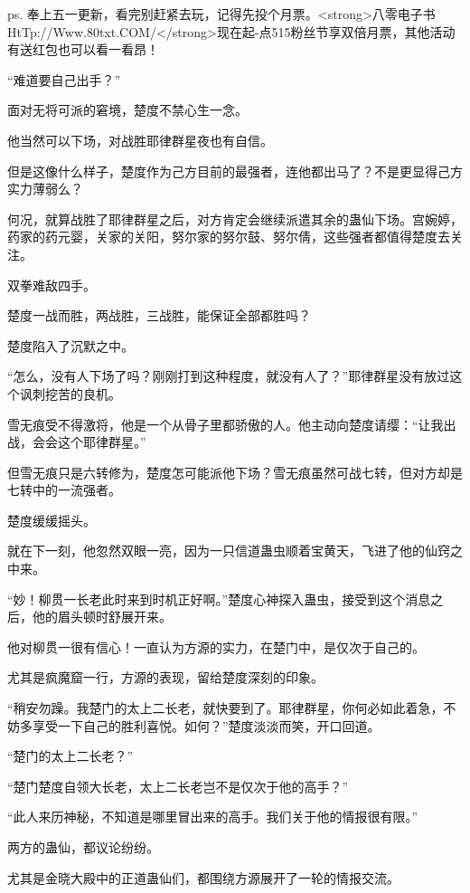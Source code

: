 
\begin{this_body}

ps. 奉上五一更新，看完别赶紧去玩，记得先投个月票。<strong>八零电子书HtTp://Www.80txt.COM/</strong>现在起-点515粉丝节享双倍月票，其他活动有送红包也可以看一看昂！

“难道要自己出手？”

面对无将可派的窘境，楚度不禁心生一念。

他当然可以下场，对战胜耶律群星夜也有自信。

但是这像什么样子，楚度作为己方目前的最强者，连他都出马了？不是更显得己方实力薄弱么？

何况，就算战胜了耶律群星之后，对方肯定会继续派遣其余的蛊仙下场。宫婉婷，药家的药元婴，关家的关阳，努尔家的努尔鼓、努尔倩，这些强者都值得楚度去关注。

双拳难敌四手。

楚度一战而胜，两战胜，三战胜，能保证全部都胜吗？

楚度陷入了沉默之中。

“怎么，没有人下场了吗？刚刚打到这种程度，就没有人了？”耶律群星没有放过这个讽刺挖苦的良机。

雪无痕受不得激将，他是一个从骨子里都骄傲的人。他主动向楚度请缨：“让我出战，会会这个耶律群星。”

但雪无痕只是六转修为，楚度怎可能派他下场？雪无痕虽然可战七转，但对方却是七转中的一流强者。

楚度缓缓摇头。

就在下一刻，他忽然双眼一亮，因为一只信道蛊虫顺着宝黄天，飞进了他的仙窍之中来。

“妙！柳贯一长老此时来到时机正好啊。”楚度心神探入蛊虫，接受到这个消息之后，他的眉头顿时舒展开来。

他对柳贯一很有信心！一直认为方源的实力，在楚门中，是仅次于自己的。

尤其是疯魔窟一行，方源的表现，留给楚度深刻的印象。

“稍安勿躁。我楚门的太上二长老，就快要到了。耶律群星，你何必如此着急，不妨多享受一下自己的胜利喜悦。如何？”楚度淡淡而笑，开口回道。

“楚门的太上二长老？”

“楚门楚度自领大长老，太上二长老岂不是仅次于他的高手？”

“此人来历神秘，不知道是哪里冒出来的高手。我们关于他的情报很有限。”

两方的蛊仙，都议论纷纷。

尤其是金晓大殿中的正道蛊仙们，都围绕方源展开了一轮的情报交流。


\end{this_body}
